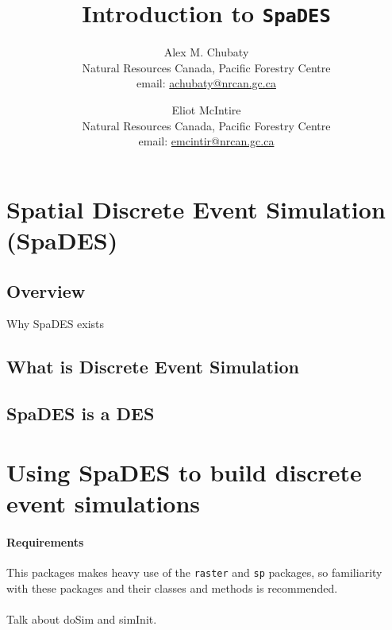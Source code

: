 \documentclass{article}
\title{Introduction to \texttt{SpaDES}}
\author{
  Alex M. Chubaty\\
	\small{Natural Resources Canada, Pacific Forestry Centre}\\
	\small{email: \href{mailto:achubaty@nrcan.gc.ca}{achubaty@nrcan.gc.ca}}
	\and
	Eliot McIntire\\
	\small{Natural Resources Canada, Pacific Forestry Centre}\\
	\small{email: \href{mailto:emcintir@nrcan.gc.ca}{emcintir@nrcan.gc.ca}}
}
\begin{document}


\maketitle

\tableofcontents

\newpage

\section{Spatial Discrete Event Simulation (SpaDES)}
\subsection{Overview}
Why SpaDES exists
\subsection{What is Discrete Event Simulation}

\subsection{SpaDES is a DES}



\newpage

\section{Using SpaDES to build discrete event simulations}
\paragraph{Requirements}
This packages makes heavy use of the \texttt{raster} and \texttt{sp} packages, so familiarity with these packages and their classes and methods is recommended.
\paragraph{}
Talk about doSim and simInit.
\end{document}
